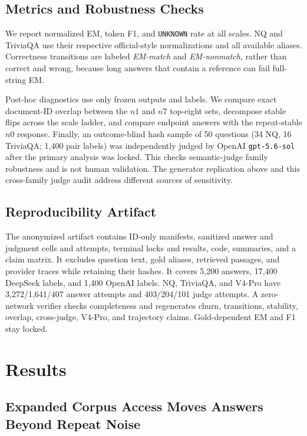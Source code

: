 \documentclass[sigconf,nonacm]{acmart}
\newcommand{\nzero}{\ensuremath{n0}}
\newcommand{\none}{\ensuremath{n1}}
\newcommand{\nseven}{\ensuremath{n7}}
\begin{document}
\subsection{Metrics and Robustness Checks}

We report normalized EM, token F1, and \texttt{UNKNOWN} rate at all scales. NQ and TriviaQA use their respective official-style normalizations and all available aliases.  Correctness transitions are labeled \emph{EM-match} and \emph{EM-nonmatch}, rather than correct and wrong, because long answers that contain a reference can fail full-string EM.

Post-hoc diagnostics use only frozen outputs and labels. We compare exact document-ID overlap between the $\none$ and $\nseven$ top-eight sets, decompose stable flips across the scale ladder, and compare endpoint answers with the repeat-stable $\nzero$ response. Finally, an outcome-blind hash sample of 50 questions (34 NQ, 16 TriviaQA; 1,400 pair labels) was independently judged by OpenAI \texttt{gpt-5.6-sol} after the primary analysis was locked. This checks semantic-judge family robustness and is not human validation. The generator replication above and this cross-family judge audit address different sources of sensitivity.

\subsection{Reproducibility Artifact}

The anonymized artifact contains ID-only manifests, sanitized answer and judgment cells and attempts, terminal locks and results, code, summaries, and a claim matrix. It excludes question text, gold aliases, retrieved passages, and provider traces while retaining their hashes. It covers 5,200 answers, 17,400 DeepSeek labels, and 1,400 OpenAI labels. NQ, TriviaQA, and V4-Pro have 3,272/1,641/407 answer attempts and 403/204/101 judge attempts. A zero-network verifier checks completeness and regenerates churn, transitions, stability, overlap, cross-judge, V4-Pro, and trajectory claims. Gold-dependent EM and F1 stay locked.

\section{Results}
\label{sec:results}

\subsection{Expanded Corpus Access Moves Answers Beyond Repeat Noise}
\end{document}
